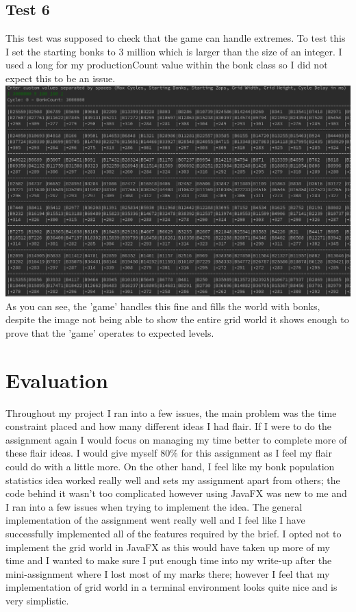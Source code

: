 \documentclass[12pt]{article}
\begin{document}
\subsection{Test 6}
This test was supposed to check that the game can handle extremes. To test this I set the starting bonks to 3 million which is larger than the size of an integer. I used a long for my productionCount value within the bonk class so I did not expect this to be an issue.\\
\includegraphics[width=15cm]{test6}
As you can see, the 'game' handles this fine and fills the world with bonks, despite the image not being able to show the entire grid world it shows enough to prove that the 'game' operates to expected levels.

\section{Evaluation}
	Throughout my project I ran into a few issues, the main problem was the time constraint placed and how many different ideas I had flair. If I were to do the assignment again I would focus on managing my time better to complete more of these flair ideas. I would give myself 80\% for this assignment as I feel my flair could do with a little more. On the other hand, I feel like my bonk population statistics idea worked really well and sets my assignment apart from others; the code behind it wasn't too complicated however using JavaFX was new to me and I ran into a few issues when trying to implement the idea. The general implementation of the assignment went really well and I feel like I have successfully implemented all of the features required by the brief. I opted not to implement the grid world in JavaFX as this would have taken up more of my time and I wanted to make sure I put enough time into my write-up after the mini-assignment where I lost most of my marks there; however I feel that my implementation of grid world in a terminal environment looks quite nice and is very simplistic.  
\end{document}
